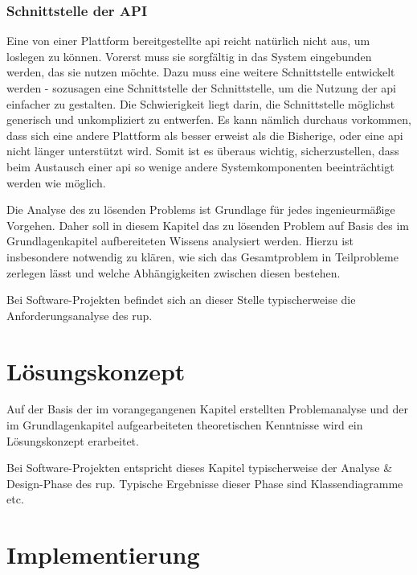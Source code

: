 \documentclass[oneside]{ausarbeitung}
\begin{document}
\subsection{Schnittstelle der API}
\label{sub:schnittstelle_der_api}

Eine von einer Plattform bereitgestellte \ac{api} reicht natürlich nicht aus, um loslegen zu können. Vorerst muss sie sorgfältig in das System eingebunden werden, das sie nutzen möchte. Dazu muss eine weitere Schnittstelle entwickelt werden - sozusagen eine Schnittstelle der Schnittstelle, um die Nutzung der \ac{api} einfacher zu gestalten. Die Schwierigkeit liegt darin, die Schnittstelle möglichst generisch und unkompliziert zu entwerfen. Es kann nämlich durchaus vorkommen, dass sich eine andere Plattform als besser erweist als die Bisherige, oder eine \ac{api} nicht länger unterstützt wird. Somit ist es überaus wichtig, sicherzustellen, dass beim Austausch einer \ac{api} so wenige andere Systemkomponenten beeinträchtigt werden wie möglich.












Die Analyse des zu lösenden Problems ist Grundlage für jedes 
ingenieurmäßige Vorgehen. Daher soll in diesem Kapitel das zu lösenden 
Problem auf Basis des im Grundlagenkapitel aufbereiteten Wissens 
analysiert werden. Hierzu ist insbesondere notwendig zu klären, wie sich 
das Gesamtproblem in Teilprobleme zerlegen lässt und welche 
Abhängigkeiten zwischen diesen bestehen.

Bei Software-Projekten befindet sich an dieser Stelle typischerweise die 
Anforderungsanalyse des \ac{rup}.

\chapter{Lösungskonzept}
\label{cha:loesungskonzept}

Auf der Basis der im vorangegangenen Kapitel erstellten Problemanalyse 
und der im Grundlagenkapitel aufgearbeiteten theoretischen Kenntnisse 
wird ein Lösungskonzept erarbeitet.

Bei Software-Projekten entspricht dieses Kapitel typischerweise der 
Analyse \& Design-Phase des \ac{rup}. Typische Ergebnisse dieser Phase sind 
Klassendiagramme etc.

\chapter{Implementierung}
\label{cha:implementierung}
\end{document}
